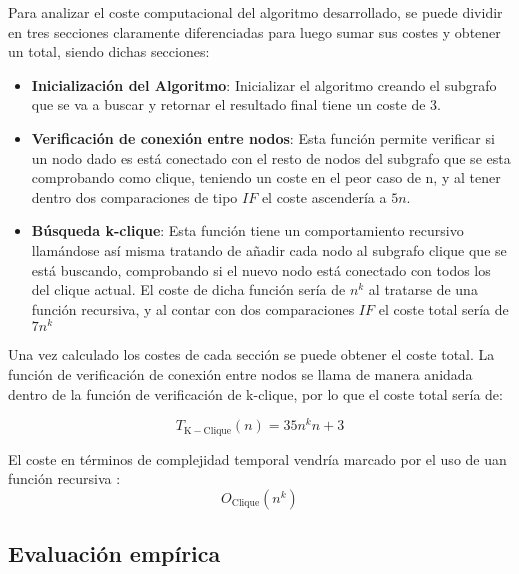 Para analizar el coste computacional del algoritmo desarrollado, se puede dividir en tres secciones claramente diferenciadas para luego sumar sus costes y obtener un total, siendo dichas secciones: 

\begin{itemize}
    
    \item \textbf{Inicialización del Algoritmo}: Inicializar el algoritmo creando el subgrafo que se va a buscar y retornar el resultado final tiene un coste de 3.

    \item \textbf{Verificación de conexión entre nodos}: Esta función permite verificar si un nodo dado es está conectado con el resto de nodos del subgrafo que se esta comprobando como clique, teniendo un coste en el peor caso de n, y al tener dentro dos comparaciones de tipo $IF$ el coste ascendería a $5n$.

    \item \textbf{Búsqueda k-clique}: Esta función tiene un comportamiento recursivo llamándose así misma tratando de añadir cada nodo al subgrafo clique que se está buscando, comprobando si el nuevo nodo está conectado con todos los del clique actual.
    El coste de dicha función sería de $n^k$ al tratarse de una función recursiva, y al contar con dos comparaciones $IF$ el coste total sería de $7n^k$


\end{itemize}

Una vez calculado los costes de cada sección se puede obtener el coste total. La función de verificación de conexión entre nodos se llama de  manera anidada dentro de la función de verificación de k-clique, por lo que el coste total sería de:

\begin{equation}
    T_{\mathrm{K-Clique}}(n) = 35n^k n +3
\end{equation}

El coste en términos de complejidad temporal vendría marcado por el uso de uan función recursiva : 
\begin{equation}
    O_{\mathrm{Clique}}(n^k) 
\end{equation}



\subsection*{Evaluación empírica}

